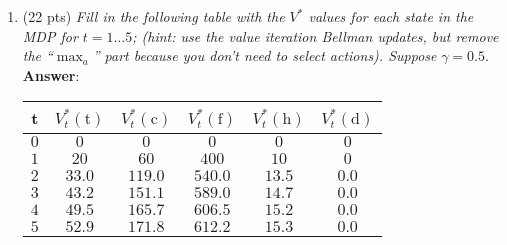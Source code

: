 \documentclass[fleqn]{hw4}
\begin{document}
\begin{enumerate}

\item(22 pts)\textit{ Fill in the following table with the $V^*$ values for each state in
the MDP for $t = 1 \dots 5$; (hint: use the value iteration Bellman updates, but
remove the ``$\max_a$'' part because you don't need to select
actions).  Suppose} $\gamma = 0.5$. \\

\textbf{Answer}:

\begin{tabular}{|c||c|c|c|c|c|}
\hline
{\bf t} & $V_t^*(\text{t})$ & $V_t^*(\text{c})$ & $V_t^*(\text{f})$ & $V_t^*(\text{h})$ & $V_t^*(\text{d})$ \\
\hline
$0$     & $0$               & $0$               & $0$               & $0$               & $0$ \\
\hline
$1$     & $20$              & $60$              & $400$             & $10$              & $0$ \\
\hline
$2$     & $33.0$           & $119.0$            & $540.0$           & $13.5$            & $0.0$ \\
\hline
$3$     & $43.2$           & $151.1$            & $589.0$           & $14.7$            & $0.0$ \\
\hline
$4$     & $49.5$           & $165.7$            & $606.5$           & $15.2$            & $0.0$ \\
\hline
$5$     & $52.9$           & $171.8$            & $612.2$           & $15.3$            & $0.0$ \\
\hline
\end{tabular}


\end{enumerate}
\end{document}
